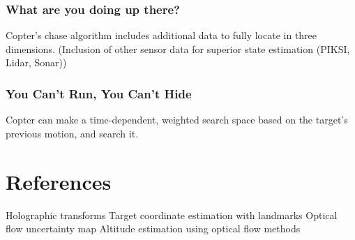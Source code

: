 \documentclass[11pt]{article}
\begin{document}
    \subsubsection{What are you doing up there?}
      Copter's chase algorithm includes additional data to fully locate in three dimensions.
        (Inclusion of other sensor data for superior state estimation (PIKSI, Lidar, Sonar))

    \subsubsection{You Can't Run, You Can't Hide}
      Copter can make a time-dependent, weighted search space based on the target's previous motion, and search it.


  \section{References}
    Holographic transforms
    Target coordinate estimation with landmarks
    Optical flow uncertainty map
    Altitude estimation using optical flow methods











	
\end{document}
